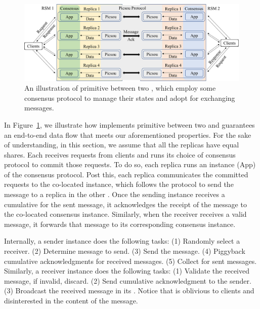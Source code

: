 \begin{figure}[t]
    \centering
    \includegraphics[width=0.85\columnwidth]{end-flow.pdf}
    \caption{An illustration of \CCC{} primitive between two , which employ some consensus protocol to manage their states and
    adopt \Scrooge{} for exchanging messages.}
    \label{fig:end-flow}
\end{figure}

In Figure~\ref{fig:end-flow}, we illustrate how \Scrooge{} implements \CCC{} primitive between two  
and guarantees an end-to-end data flow that meets our aforementioned properties.
For the sake of understanding, in this section, we assume that all the replicas have equal shares.
Each \RSM{} receives requests from clients and runs its choice of consensus protocol to commit those requests. 
To do so, each replica runs an instance (App) of the consensus protocol.
Post this, each replica communicates the committed requests to the co-located \Scrooge{} instance, which 
follows the \Scrooge{} protocol to send the message to a replica in the other \RSM{}.
Once the sending \Scrooge{} instance receives a cumulative \quack{} for the sent message, 
it acknowledges the receipt of the message to the co-located consensus instance.
Similarly, when the receiver receives a valid message, it forwards that message to its corresponding consensus instance.

Internally, a sender \Scrooge{} instance does the following tasks:
(1) Randomly select a receiver.
(2) Determine message to send.
(3) Send the message.
(4) Piggyback cumulative acknowledgments for received messages.
(5) Collect  for sent messages.
%
Similarly, a receiver \Scrooge{} instance does the following tasks:
(1) Validate the received message, if invalid, discard.
(2) Send cumulative acknowledgment to the sender.
(3) Broadcast the received message in its \RSM{}.
%
Notice that \Scrooge{} is oblivious to clients and disinterested in the content of the message.


